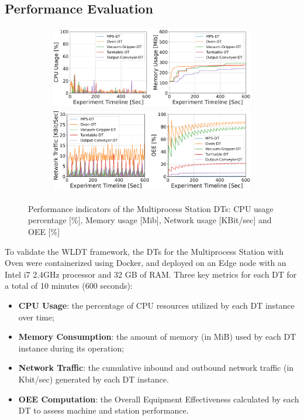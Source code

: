 \subsection{Performance Evaluation}


\begin{figure}
    \centering
    \begin{subfigure}{0.75\textwidth}
        \centering
        \includegraphics[width=\linewidth]{figures/wldt-results-2.pdf}\\[-2pt]
        \includegraphics[width=\linewidth]{figures/wldt-results-1.pdf}
    \end{subfigure}
    \caption{Performance indicators of the Multiprocess Station DTs: CPU usage percentage [\%], Memory usage [Mib], Network usage [KBit/sec] and OEE [\%]}
    \label{fig:exp-results}
\end{figure}


To validate the \ac{WLDT} framework,
the \acp{DT} for the Multiprocess Station with Oven were containerized using Docker, and deployed on an Edge node with an Intel i7 2.4GHz processor and 32 GB of RAM.
%
Three key metrics for each DT for a total of 10 minutes (600 seconds):
\begin{itemize}
    \item \textbf{CPU Usage}: the percentage of CPU resources utilized by each DT instance over time;
    \item \textbf{Memory Consumption}: the amount of memory (in MiB) used by each DT instance during its operation;
    \item \textbf{Network Traffic}: the cumulative inbound and outbound network traffic (in Kbit/sec) generated by each DT instance.
    \item \textbf{OEE Computation}: the Overall Equipment Effectiveness calculated by each DT to assess machine and station performance.
\end{itemize}

